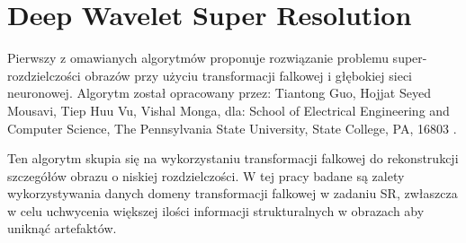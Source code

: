 \chapter{Deep Wavelet Super Resolution}


Pierwszy z omawianych algorytmów proponuje rozwiązanie problemu super-rozdzielczości obrazów przy użyciu transformacji falkowej i głębokiej sieci neuronowej. Algorytm został opracowany przez: Tiantong Guo, Hojjat Seyed Mousavi, Tiep Huu Vu, Vishal Monga, dla: School of Electrical Engineering and Computer Science, The Pennsylvania State University, State College, PA, 16803 \cite{guo2017deep}.

Ten algorytm skupia się na wykorzystaniu transformacji falkowej do rekonstrukcji szczegółów obrazu o niskiej rozdzielczości.
W tej pracy badane są zalety wykorzystywania danych domeny transformacji falkowej w zadaniu SR, zwłaszcza w celu uchwycenia większej ilości informacji strukturalnych w obrazach aby uniknąć artefaktów. 

